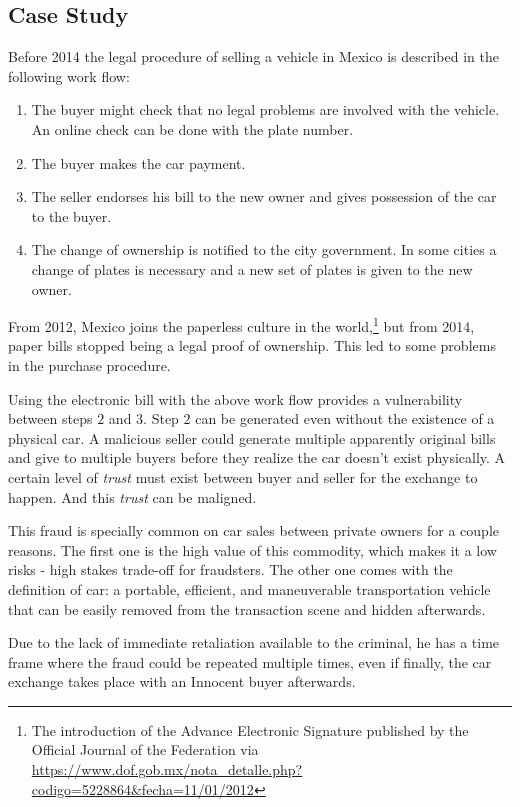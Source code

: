 \subsection{Case Study}
Before 2014 the legal procedure of selling a vehicle in Mexico is described in the following
work flow:
\begin{enumerate}
    \item The buyer might check that no legal problems are involved with the vehicle. 
          An online check can be done with the plate number. 
    \item The buyer makes the car payment.
    \item The seller endorses his bill to the new owner and gives possession of the car 
    to the buyer.
    \item The change of ownership is notified to the city government. In some cities a 
        change of plates is necessary and a new set of plates is given to the new owner.
\end{enumerate}

From 2012, Mexico joins the paperless culture in the world,\footnote{The introduction of the Advance
Electronic Signature published by the Official Journal of the Federation via \url{https://www.dof.gob.mx/nota_detalle.php?codigo=5228864&fecha=11/01/2012}} 
but from 2014, paper bills stopped being a legal proof of ownership. 
This led to some problems in the purchase procedure.

Using the electronic bill with the above work flow provides a vulnerability between steps $2$ and $3$. 
Step $2$ can be generated even without the existence of a physical car. A malicious seller 
could generate multiple apparently original bills and give to multiple buyers before 
they realize the car doesn't exist physically. A certain level of \textit{trust} must 
exist between buyer and seller for the exchange to happen. And this \textit{trust} can be 
maligned. 

This fraud is specially common on car sales between private owners for a couple reasons. 
The first one is the high value of this commodity, which makes it a low risks - high stakes 
trade-off for fraudsters. The other one comes with the definition of car: a portable, efficient, 
and maneuverable transportation vehicle that can be easily removed from the transaction scene 
and hidden afterwards.

Due to the lack of immediate retaliation available to the criminal, he has a time frame where 
the fraud could be repeated multiple times, even if finally, the car exchange takes place with 
an Innocent buyer afterwards.

